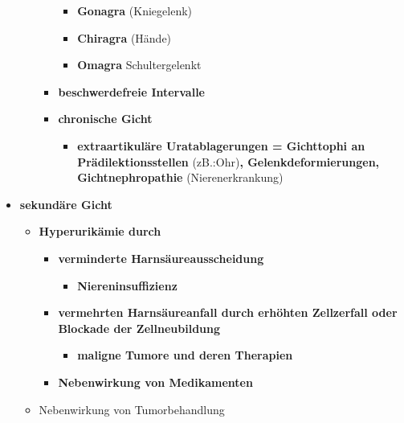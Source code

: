 \begin{itemize}
\begin{itemize}
\begin{itemize}
\begin{itemize}
								\item \textbf{Gonagra} (Kniegelenk)
								\item \textbf{Chiragra} (Hände)
								\item \textbf{Omagra} Schultergelenkt
							\end{itemize}
						\item \textbf{beschwerdefreie Intervalle}
						\item \textbf{chronische Gicht}
							\begin{itemize}
								\item \textbf{extraartikuläre Uratablagerungen = Gichttophi an Prädilektionsstellen} (zB.:Ohr)\textbf{, Gelenkdeformierungen, Gichtnephropathie} (Nierenerkrankung)
							\end{itemize}
					\end{itemize}								
			\end{itemize}
		\item \textbf{sekundäre Gicht}
			\begin{itemize}
				\item \textbf{Hyperurikämie durch}
					\begin{itemize}
						\item \textbf{verminderte Harnsäureausscheidung}
							\begin{itemize}
								\item \textbf{Niereninsuffizienz}
							\end{itemize}
						\item \textbf{vermehrten Harnsäureanfall durch erhöhten Zellzerfall oder Blockade der Zellneubildung}
							\begin{itemize}
								\item \textbf{maligne Tumore und deren Therapien}
							\end{itemize}
						\item \textbf{Nebenwirkung von Medikamenten}
					\end{itemize}
				\item Nebenwirkung von Tumorbehandlung
			\end{itemize}
	\end{itemize}
